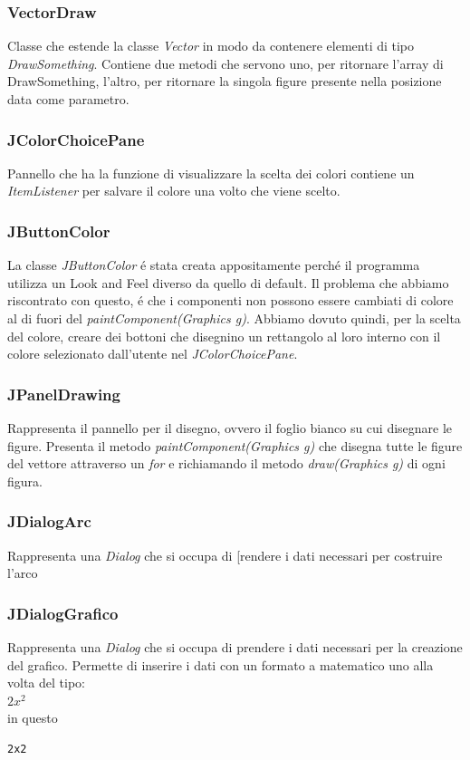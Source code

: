 \documentclass[a4paper,12pt,times,numbered,print,index]{article}
\begin{document}
\subsubsection{VectorDraw}
Classe che estende la classe \textit{Vector} in modo da contenere elementi di tipo \textit{DrawSomething}.
Contiene due metodi che servono uno, per ritornare l'array di DrawSomething, l'altro, per ritornare la singola figure presente nella posizione data come parametro.
\subsubsection{JColorChoicePane}
Pannello che ha la funzione di visualizzare la scelta dei colori contiene un \textit{ItemListener} per salvare il colore una volto che viene scelto.
\subsubsection{JButtonColor}
La classe \textit{JButtonColor} é stata creata appositamente perché il programma utilizza un Look and Feel diverso da quello di default. Il problema che abbiamo riscontrato con questo, é che i componenti non possono essere cambiati di colore al di fuori del \textit{paintComponent(Graphics g)}. Abbiamo dovuto quindi, per la scelta del colore, creare dei bottoni che disegnino un rettangolo al loro interno con il colore selezionato dall'utente nel \textit{JColorChoicePane}.
\subsubsection{JPanelDrawing}
Rappresenta il pannello per il disegno, ovvero il foglio bianco su cui disegnare le figure. Presenta il metodo \textit{paintComponent(Graphics g)} che disegna tutte le figure del vettore attraverso un \textit{for} e richiamando il metodo \textit{draw(Graphics g)} di ogni figura.
\subsubsection{JDialogArc}
Rappresenta una \textit{Dialog} che si occupa di [rendere i dati necessari per costruire l'arco 
\subsubsection{JDialogGrafico}
Rappresenta una \textit{Dialog} che si occupa di prendere i dati necessari per la creazione del grafico. Permette di inserire i dati con un formato a matematico uno alla volta del tipo:\\
$2x^2$\\
in questo
\begin{lstlisting}
2x2
\end{lstlisting}
\end{document}
